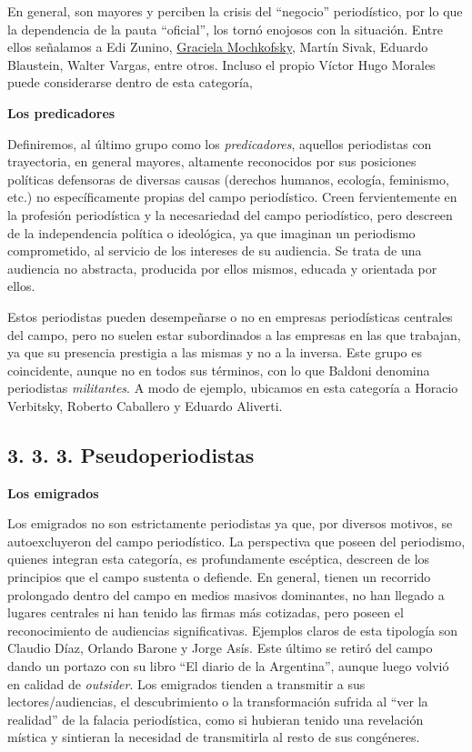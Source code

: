 {En general, son mayores y perciben la crisis del ``negocio'' periodístico, por lo que la dependencia de la pauta ``oficial'', los tornó enojosos con la situación. Entre ellos señalamos a Edi Zunino, \href{http://www.tematika.com/buscar.do?seccionDeBusqueda=En+Libros\&seccion=1\&claveDeBusqueda=porAutor\&txtencoded=Graciela+Mochkofsky\&idAutor=35432\&criterioDeOrden=2\&idSeccion=1\&texto=Graciela+Mochkofsky\&optSeleccionada=Autor\&idSeccionPropia=1}{Graciela Mochkofsky}, Martín Sivak, Eduardo Blaustein, Walter Vargas, entre otros. Incluso el propio Víctor Hugo Morales puede considerarse dentro de esta categoría,

\textbf{Los predicadores}

Definiremos, al último grupo como los \emph{predicadores}, aquellos periodistas con trayectoria, en general mayores, altamente reconocidos por sus posiciones políticas defensoras de diversas causas (derechos humanos, ecología, feminismo, etc.) no específicamente propias del campo periodístico. Creen fervientemente en la profesión periodística y la necesariedad del campo periodístico, pero descreen de la independencia política o ideológica, ya que imaginan un periodismo comprometido, al servicio de los intereses de su audiencia. Se trata de una audiencia no abstracta, producida por ellos mismos, educada y orientada por ellos.

Estos periodistas pueden desempeñarse o no en empresas periodísticas centrales del campo, pero no suelen estar subordinados a las empresas en las que trabajan, ya que su presencia prestigia a las mismas y no a la inversa. Este grupo es coincidente, aunque no en todos sus términos, con lo que Baldoni denomina periodistas \emph{militantes}. A modo de ejemplo, ubicamos en esta categoría a Horacio Verbitsky, Roberto Caballero y Eduardo Aliverti.


\subsection{3. 3. 3. Pseudoperiodistas}

\textbf{Los emigrados}

Los emigrados no son estrictamente periodistas ya que, por diversos motivos, se autoexcluyeron del campo periodístico. La perspectiva que poseen del periodismo, quienes integran esta categoría, es profundamente escéptica, descreen de los principios que el campo sustenta o defiende. En general, tienen un recorrido prolongado dentro del campo en medios masivos dominantes, no han llegado a lugares centrales ni han tenido las firmas más cotizadas, pero poseen el reconocimiento de audiencias significativas. Ejemplos claros de esta tipología son Claudio Díaz, Orlando Barone y Jorge Asís. Este último se retiró del campo dando un portazo con su libro ``El diario de la Argentina'', aunque luego volvió en calidad de \emph{outsider}. Los emigrados tienden a transmitir a sus lectores/audiencias, el descubrimiento o la transformación sufrida al ``ver la realidad'' de la falacia periodística, como si hubieran tenido una revelación mística y sintieran la necesidad de transmitirla al resto de sus congéneres.

}
